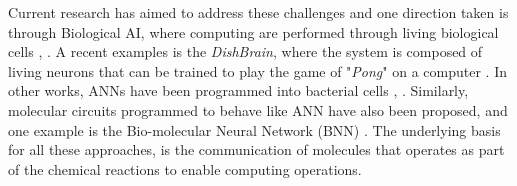 \documentclass[twocolumn]{biophys-new}
\begin{document}
{{%
Current research has aimed to address these challenges and one direction taken is through Biological AI, where computing are performed through living biological cells \cite{balasubramaniam2023realizing}, \cite{bi2021survey}. A recent examples is the \emph{DishBrain}, where the system is composed of living neurons that can be trained to play the game of  "\emph{Pong}" on a computer \cite{kagan2022vitro}. 
In other works, ANNs have been programmed into bacterial cells \cite{becerra2022computing}, \cite{li2021synthetic}.
Similarly, molecular circuits programmed to behave like ANN have also been proposed, and one example is the %
Bio-molecular Neural Network (BNN)   \cite{samaniego2021signaling}.
The underlying basis for all these approaches, is the communication of molecules \cite{soldner2020survey}  that operates as part of the chemical reactions to enable computing operations.



}}
\end{document}
